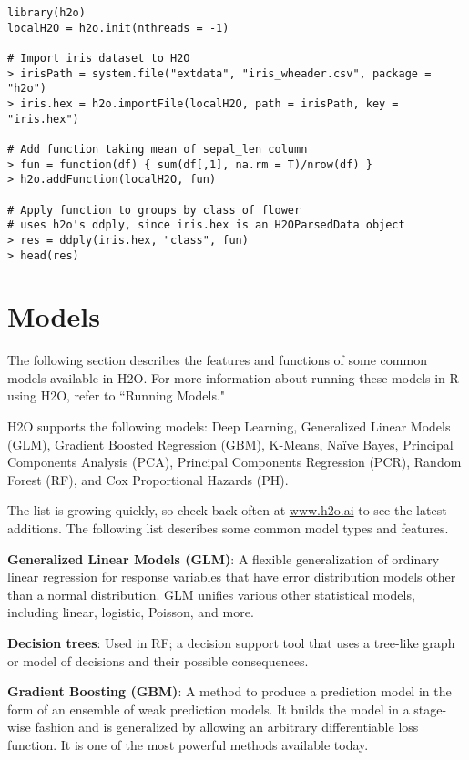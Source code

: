 \begin{lstlisting}[style=R]
library(h2o)
localH2O = h2o.init(nthreads = -1)

# Import iris dataset to H2O
> irisPath = system.file("extdata", "iris_wheader.csv", package = "h2o")
> iris.hex = h2o.importFile(localH2O, path = irisPath, key = "iris.hex")

# Add function taking mean of sepal_len column
> fun = function(df) { sum(df[,1], na.rm = T)/nrow(df) }
> h2o.addFunction(localH2O, fun)

# Apply function to groups by class of flower
# uses h2o's ddply, since iris.hex is an H2OParsedData object
> res = ddply(iris.hex, "class", fun)
> head(res)
\end{lstlisting}

\section{Models}

The following section describes the features and functions of some common models available in H2O.  For more information about running these models in R using H2O, refer to ``Running Models." 

H2O supports the following models: Deep Learning, Generalized Linear Models (GLM), Gradient Boosted Regression (GBM), K-Means, Na\"{i}ve Bayes, Principal Components Analysis (PCA), Principal Components Regression (PCR), Random Forest (RF), and Cox Proportional Hazards (PH). 

The list is growing quickly, so check back often at \url{www.h2o.ai} to see the latest additions. The following list describes some common model types and features. 

{\textbf{Generalized Linear Models (GLM)}}: A flexible generalization of ordinary linear regression for response variables that have error distribution models other than a normal distribution. GLM unifies various other statistical models, including linear, logistic, Poisson, and more.

{\textbf{Decision trees}}: Used in RF; a decision support tool that uses a tree-like graph or model of decisions and their possible consequences.

{\textbf{Gradient Boosting (GBM)}}: A method to produce a prediction model in the form of an ensemble of weak prediction models. It builds the model in a stage-wise fashion and is generalized by allowing an arbitrary differentiable loss function. It is one of the most powerful methods available today.

